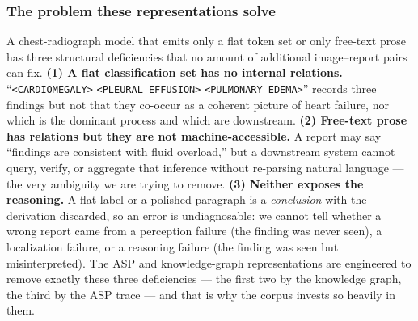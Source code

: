 \documentclass[11pt,a4paper]{article}
\begin{document}
\subsubsection{The problem these representations solve}
A chest-radiograph model that emits only a flat token set or only free-text prose has three structural deficiencies that no amount of additional image--report pairs can fix. \textbf{(1) A flat classification set has no internal relations.} ``\texttt{<CARDIOMEGALY>} \texttt{<PLEURAL\_EFFUSION>} \texttt{<PULMONARY\_EDEMA>}'' records three findings but not that they co-occur as a coherent picture of heart failure, nor which is the dominant process and which are downstream. \textbf{(2) Free-text prose has relations but they are not machine-accessible.} A report may say ``findings are consistent with fluid overload,'' but a downstream system cannot query, verify, or aggregate that inference without re-parsing natural language --- the very ambiguity we are trying to remove. \textbf{(3) Neither exposes the reasoning.} A flat label or a polished paragraph is a \emph{conclusion} with the derivation discarded, so an error is undiagnosable: we cannot tell whether a wrong report came from a perception failure (the finding was never seen), a localization failure, or a reasoning failure (the finding was seen but misinterpreted). The ASP and knowledge-graph representations are engineered to remove exactly these three deficiencies --- the first two by the knowledge graph, the third by the ASP trace --- and that is why the corpus invests so heavily in them.
\end{document}
